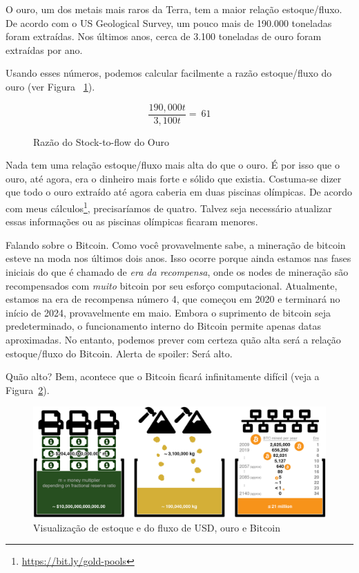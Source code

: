 O ouro, um dos metais mais raros da Terra, tem a maior relação estoque/fluxo. De acordo com o US Geological Survey, um pouco mais de 190.000 toneladas foram extraídas. Nos últimos anos, cerca de 3.100 toneladas de ouro foram extraídas por ano.~\cite{mineral-commodity-summaries}

Usando esses números, podemos calcular facilmente a razão estoque/fluxo do ouro (ver Figura ~\ref{fig:stock-to-flow-gold}).

\begin{figure}
  \centering
  \begin{equation}
  \frac{190,000 t}{3,100 t} = ~ 61
  \end{equation}
  \caption{Razão do Stock-to-flow do Ouro}
  \label{fig:stock-to-flow-gold}
\end{figure}

Nada tem uma relação estoque/fluxo mais alta do que o ouro. É por isso que o ouro, até agora, era o dinheiro mais forte e sólido que existia. Costuma-se dizer que todo o ouro extraído até agora caberia em duas piscinas olímpicas. De acordo com meus cálculos\footnote{\url{https://bit.ly/gold-pools}}, precisaríamos de quatro. Talvez seja necessário atualizar essas informações ou as piscinas olímpicas ficaram menores.

Falando sobre o Bitcoin. Como você provavelmente sabe, a mineração de bitcoin esteve na moda nos últimos dois anos. Isso ocorre porque ainda estamos nas fases iniciais do que é chamado de \textit{era da recompensa}, onde os nodes de mineração são recompensados com \textit{muito} bitcoin por seu esforço computacional. Atualmente, estamos na era de recompensa número 4, que começou em 2020 e terminará no início de 2024, provavelmente em maio. Embora o suprimento de bitcoin seja predeterminado, o funcionamento interno do Bitcoin permite apenas datas aproximadas. No entanto, podemos prever com certeza quão alta será a relação estoque/fluxo do Bitcoin. Alerta de spoiler: Será alto.

Quão alto? Bem, acontece que o Bitcoin ficará infinitamente difícil (veja a Figura~\ref{fig:stock-to-flow-white-cropped}).

\begin{figure}
  \includegraphics{assets/images/stock-to-flow-white-cropped.png}
  \caption{Visualização de estoque e do fluxo de USD, ouro e Bitcoin}
  \label{fig:stock-to-flow-white-cropped}
\end{figure}

